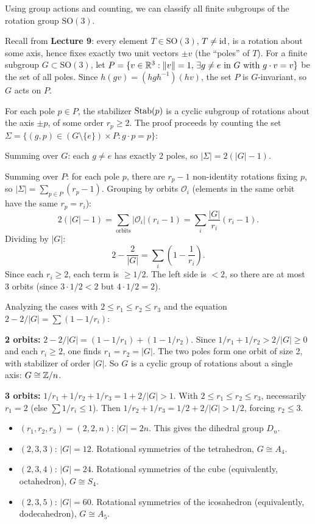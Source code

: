 \documentclass{report}
\begin{document}
Using group actions and counting, we can classify all finite subgroups of the rotation group \(\mathrm{SO}(3)\).

Recall from \textbf{Lecture 9}: every element \(T \in \mathrm{SO}(3)\), \(T \neq \text{id}\), is a rotation about some axis, hence fixes exactly two unit vectors \(\pm v\) (the ``poles'' of \(T\)). For a finite subgroup \(G \subset \mathrm{SO}(3)\), let \(P = \{v \in \RR^3 : \|v\| = 1, \, \exists g \neq e \text{ in } G \text{ with } g \cdot v = v\}\) be the set of all poles. Since \(h(gv) = (hgh^{-1})(hv)\), the set \(P\) is \(G\)-invariant, so \(G\) acts on \(P\).

For each pole \(p \in P\), the stabilizer \(\operatorname{Stab}(p)\) is a cyclic subgroup of rotations about the axis \(\pm p\), of some order \(r_p \geq 2\). The proof proceeds by counting the set \(\Sigma = \{(g, p) \in (G \setminus \{e\}) \times P : g \cdot p = p\}\):

Summing over \(G\): each \(g \neq e\) has exactly 2 poles, so \(|\Sigma| = 2(|G| - 1)\).

Summing over \(P\): for each pole \(p\), there are \(r_p - 1\) non-identity rotations fixing \(p\), so \(|\Sigma| = \sum_{p \in P} (r_p - 1)\). Grouping by orbits \(\mathcal{O}_i\) (elements in the same orbit have the same \(r_p = r_i\)):
\[2(|G| - 1) = \sum_{\text{orbits}} |\mathcal{O}_i|(r_i - 1) = \sum_i \frac{|G|}{r_i}(r_i - 1).\]
Dividing by \(|G|\):
\[2 - \frac{2}{|G|} = \sum_i \left(1 - \frac{1}{r_i}\right).\]
Since each \(r_i \geq 2\), each term is \(\geq 1/2\). The left side is \(< 2\), so there are at most 3 orbits (since \(3 \cdot 1/2 < 2\) but \(4 \cdot 1/2 = 2\)).

Analyzing the cases with \(2 \leq r_1 \leq r_2 \leq r_3\) and the equation \(2 - 2/|G| = \sum(1 - 1/r_i)\):

\textbf{2 orbits:} \(2 - 2/|G| = (1 - 1/r_1) + (1 - 1/r_2)\). Since \(1/r_1 + 1/r_2 > 2/|G| \geq 0\) and each \(r_i \geq 2\), one finds \(r_1 = r_2 = |G|\). The two poles form one orbit of size 2, with stabilizer of order \(|G|\). So \(G\) is a cyclic group of rotations about a single axis: \(G \cong \ZZ/n\).

\textbf{3 orbits:} \(1/r_1 + 1/r_2 + 1/r_3 = 1 + 2/|G| > 1\). With \(2 \leq r_1 \leq r_2 \leq r_3\), necessarily \(r_1 = 2\) (else \(\sum 1/r_i \leq 1\)). Then \(1/r_2 + 1/r_3 = 1/2 + 2/|G| > 1/2\), forcing \(r_2 \leq 3\).

\begin{itemize}
    \item \((r_1, r_2, r_3) = (2, 2, n)\): \(|G| = 2n\). This gives the dihedral group \(D_n\).
    \item \((2, 3, 3)\): \(|G| = 12\). Rotational symmetries of the tetrahedron, \(G \cong A_4\).
    \item \((2, 3, 4)\): \(|G| = 24\). Rotational symmetries of the cube (equivalently, octahedron), \(G \cong S_4\).
    \item \((2, 3, 5)\): \(|G| = 60\). Rotational symmetries of the icosahedron (equivalently, dodecahedron), \(G \cong A_5\).
\end{itemize}
\end{document}
